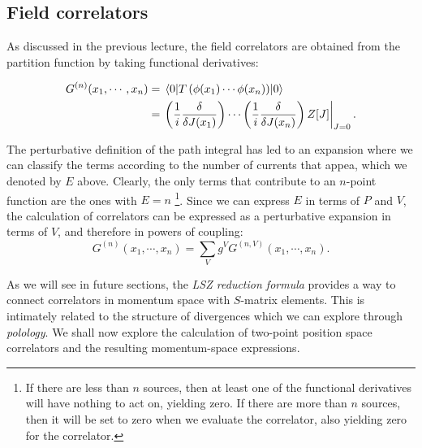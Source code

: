 \documentclass{article}
\numberwithin{equation}{section}
\begin{document}
\subsection{Field correlators}
As discussed in the previous lecture, the field correlators are obtained from the partition function by taking functional derivatives:

\begin{equation}
\begin{aligned}
    G^{(n)}(x_1, \cdots , x_n) &= \ev{T\left(\phi(x_1) \cdots \phi(x_n)\right)}{0} \\
    &= \eval{\left(\frac{1}{i}\fdv{J(x_1)}\right) \cdots \left(\frac{1}{i}\fdv{J(x_n)}\right) Z[J]}_{J=0}.
\end{aligned}
\end{equation}

The perturbative definition of the path integral has led to an expansion where we can classify the terms according to the number of currents that appea, which we denoted by $E$ above. Clearly, the only terms that contribute to an $n$-point function are the ones with $E=n$ \footnote{If there are less than $n$ sources, then at least one of the functional derivatives will have nothing to act on, yielding zero. If there are more than $n$ sources, then it will be set to zero when we evaluate the correlator, also yielding zero for the correlator.}. Since we can express $E$ in terms of $P$ and $V$, the calculation of correlators can be expressed as a perturbative expansion in terms of $V$, and therefore in powers of coupling:
\begin{equation}
    G^{(n)}(x_1, \cdots, x_n) = \sum_V g^V G^{(n, V)}(x_1, \cdots , x_n).
\end{equation}

As we will see in future sections, the \textit{LSZ reduction formula} provides a way to connect correlators in momentum space with $S$-matrix elements. This is intimately related to the structure of divergences which we can explore through \textit{polology}. We shall now explore the calculation of two-point position space correlators and the resulting momentum-space expressions.
\end{document}
